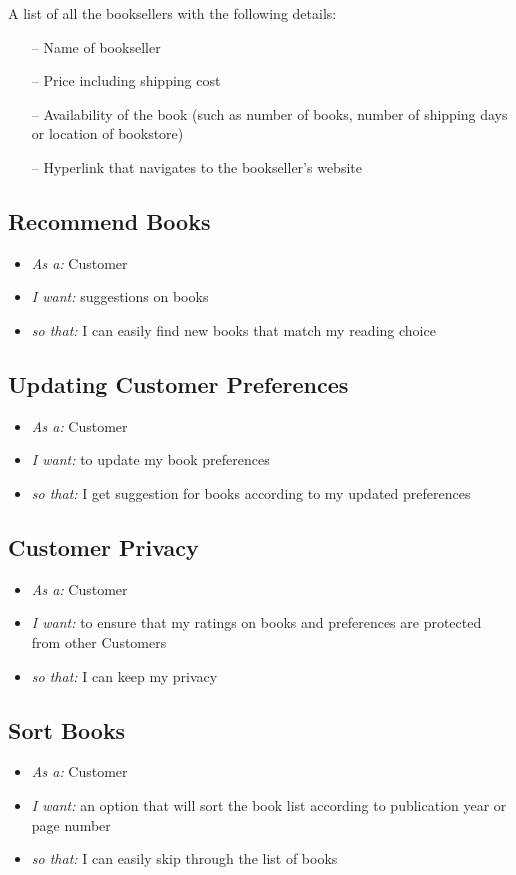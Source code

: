 \documentclass{article}
\begin{document}
A list of all the booksellers with the following details:
\begin{itemize}
	\item[--] Name of bookseller
	\item[--] Price including shipping cost
	\item[--] Availability of the book (such as number of books, number of shipping days or location of bookstore)
	\item[--]  Hyperlink that navigates to the bookseller’s website
\end{itemize}

\subsection{Recommend Books}
\begin{itemize}
\item \emph{As a:} Customer
\item \emph{I want:} suggestions on books 
\item \emph{so that:} I can easily find new books that match my reading choice
\end{itemize}

\subsection{Updating Customer Preferences}
\begin{itemize}
\item \emph{As a:} Customer
\item \emph{I want:} to update my book preferences 
\item \emph{so that:} I get suggestion for books according to my updated preferences
\end{itemize}

\subsection{Customer Privacy}
\begin{itemize}
\item \emph{As a:} Customer
\item \emph{I want:}  to ensure that my ratings on books and preferences are protected from other Customers
\item \emph{so that:} I can keep my privacy
\end{itemize}

\subsection{Sort Books}
\begin{itemize}
\item \emph{As a:} Customer
\item \emph{I want:}  an option that will sort the book list according to publication year or page number 
\item \emph{so that:} I can easily skip through the list of books
\end{itemize}
\end{document}
